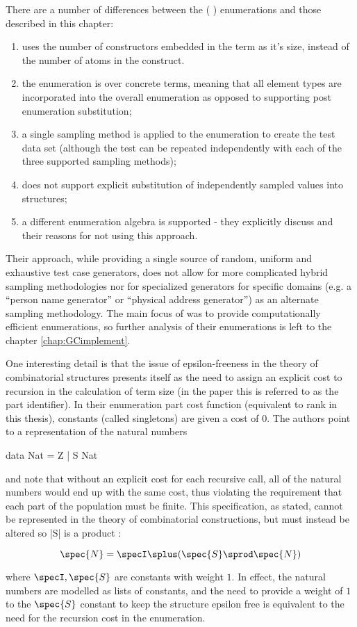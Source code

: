 
There are a number of differences between the \FEAT (\cite{Duregard2012} ) enumerations
and those described in this chapter:

\begin{enumerate}
\item \FEAT uses the number of constructors embedded in the term as it's size,
instead of the number of atoms in the construct.
\item the enumeration is over concrete terms, meaning that all element types are incorporated into the overall enumeration
as opposed to supporting post enumeration substitution;
\item  a single sampling method is applied to the enumeration to create the test data set
(although the test can be repeated independently with each of the three supported sampling methods);
\item \FEAT does not support explicit substitution of independently sampled values into structures;
\item a different enumeration algebra is supported - 
they explicitly discuss \cite{FlSa95} and their reasons for not using this approach.
\end{enumerate}

Their approach, while providing a single source of random, uniform and exhaustive test case generators,
does not allow for more complicated hybrid sampling methodologies
nor for specialized generators for specific domains (e.g. a ``person name generator'' or ``physical address generator'')
as an alternate sampling methodology.
The main focus of \FEAT was to provide computationally efficient enumerations,
so further analysis of their enumerations is left to the chapter \ref{chap:GCimplement}.

One interesting detail is that the issue of epsilon-freeness in the theory of combinatorial structures
presents itself as the need to assign an explicit cost to recursion in the calculation of term size
(in the paper this is referred to as the part identifier).
In their enumeration part cost function (equivalent to rank in this thesis),
constants (called singletons) are given a cost of $0$.
The authors point to a representation of the natural numbers

\begin{code}
data Nat = Z | S Nat
\end{code}

and note that without an explicit cost for each recursive call,
all of the natural numbers would end up with the same cost,
thus violating the requirement that each part of the population must be finite.
This specification, as stated, cannot be represented in the theory of combinatorial constructions,
but must instead be altered so |S| is a product :

$$ \spec{N} = \specI \splus (\spec{S} \sprod \spec{N}) $$

where $\specI, \spec{S}$ are constants with weight $1$.
In effect, the natural numbers are modelled as lists of constants,
and the need to provide a weight of $1$ to the $\spec{S}$ constant to keep the structure epsilon free
is equivalent to the need for the recursion cost in the \FEAT enumeration.


